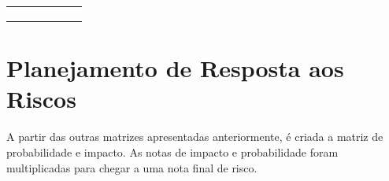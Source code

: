 \begin{table}[H]
\begin{tabular}{|c|c|c|c|c|c|}
                                          &                                                                                                                 &                                                                                           &                                                                                                      &                                                                                                                 &                                                                                                  \\ 
                                          &                                                                                                                 &                                                                                           &                                                                                                      &                                                                                                                 &      \\ 
                                          &                                                                                                                 &                                                                                           &                                                                                                      &                                                                                                                 &      \\ \hline
\end{tabular}
\end{table}

 \section{Planejamento de Resposta aos Riscos} %
 \label{sec:planejamento_de_resposta_aos_riscos}
 	
 	A partir das outras matrizes apresentadas anteriormente, é criada a matriz de probabilidade e impacto. As notas de impacto e probabilidade foram multiplicadas para chegar a uma nota final de risco.


